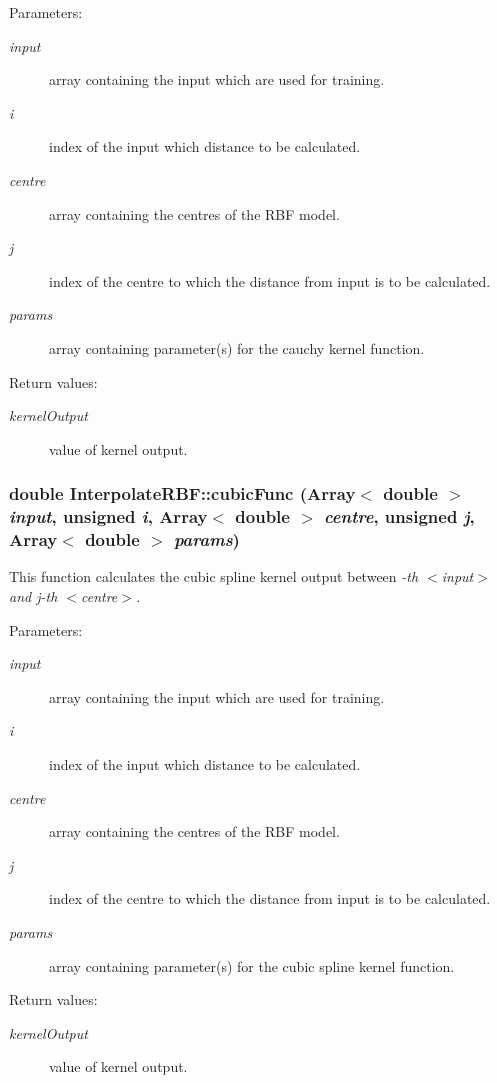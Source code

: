 \begin{Desc}
\item[Parameters:]
\begin{description}
\item[{\em input}]array containing the input which are used for training. \item[{\em i}]index of the input which distance to be calculated. \item[{\em centre}]array containing the centres of the RBF model. \item[{\em j}]index of the centre to which the distance from input is to be calculated. \item[{\em params}]array containing parameter(s) for the cauchy kernel function. \end{description}
\end{Desc}
\begin{Desc}
\item[Return values:]
\begin{description}
\item[{\em kernel\-Output}]value of kernel output.\end{description}
\end{Desc}
\subsubsection{\setlength{\rightskip}{0pt plus 5cm}double Interpolate\-RBF::cubic\-Func (Array$<$ double $>$ {\em input}, unsigned {\em i}, Array$<$ double $>$ {\em centre}, unsigned {\em j}, Array$<$ double $>$ {\em params})\hspace{0.3cm}{\tt  [static]}}\label{classInterpolateRBF_e2}


This function calculates the cubic spline kernel output between {\em -th $<$input$>$ and j-th $<$centre$>$. \/}

\begin{Desc}
\item[Parameters:]
\begin{description}
\item[{\em input}]array containing the input which are used for training. \item[{\em i}]index of the input which distance to be calculated. \item[{\em centre}]array containing the centres of the RBF model. \item[{\em j}]index of the centre to which the distance from input is to be calculated. \item[{\em params}]array containing parameter(s) for the cubic spline kernel function. \end{description}
\end{Desc}
\begin{Desc}
\item[Return values:]
\begin{description}
\item[{\em kernel\-Output}]value of kernel output.\end{description}
\end{Desc}
